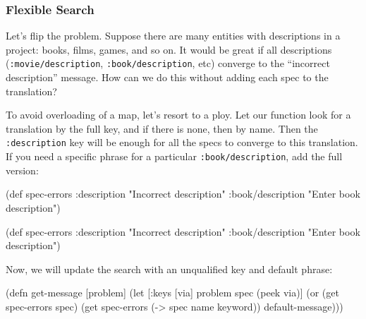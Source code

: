 \subsubsection{Flexible Search}

Let's flip the problem. Suppose there are many entities with descriptions in a project: books, films, games, and so on. It would be great if all descriptions (\verb|:movie/description|, \texttt{:book/descrip\-tion}, etc) converge to the ``incorrect description'' message. How can we do this without adding each spec to the translation?

To avoid overloading of a map, let's resort to a ploy. Let our function look for a translation by the full key, and if there is none, then by name. Then the \verb|:description| key will be enough for all the specs to converge to this translation. If you need a specific phrase for a particular \verb|:book/description|, add the full version:

\ifx\DEVICETYPE\MOBILE

  \begin{clojure}
(def spec-errors
  {:description
   "Incorrect description"
   :book/description
   "Enter book description"})
  \end{clojure}

\else

  \begin{clojure}
(def spec-errors
  {:description "Incorrect description"
   :book/description "Enter book description"})
  \end{clojure}

\fi

Now, we will update the search with an unqualified key and default phrase:

\ifx\DEVICETYPE\MOBILE

\begin{english}
  \begin{clojure}
(defn get-message
  [problem]
  (let [{:keys [via]} problem
        spec (peek via)]
    (or (get spec-errors spec)
        (get spec-errors
          (-> spec name keyword))
        default-message)))
  \end{clojure}
\end{english}

\else

